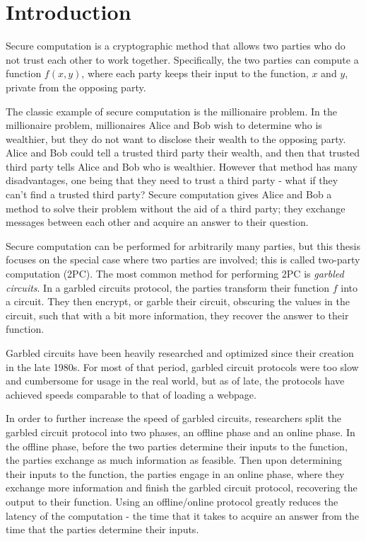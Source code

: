 

\chapter*{Introduction}

Secure computation is a cryptographic method that allows two parties who do not trust each other to work together. 
Specifically, the two parties can compute a function $f(x,y)$, where each party keeps their input to the function, $x$ and $y$, private from the opposing party.

The classic example of secure computation is the millionaire problem.
In the millionaire problem, millionaires Alice and Bob wish to determine who is wealthier, but they do not want to disclose their wealth to the opposing party.
Alice and Bob could tell a trusted third party their wealth, and then that trusted third party tells Alice and Bob who is wealthier.
However that method has many disadvantages, one being that they need to trust a third party - what if they can't find a trusted third party?
Secure computation gives Alice and Bob a method to solve their problem without the aid of a third party; they exchange messages between each other and acquire an answer to their question.

Secure computation can be performed for arbitrarily many parties, but this thesis focuses on the special case where two parties are involved; this is called two-party computation (2PC).
The most common method for performing 2PC is \textit{garbled circuits}.
In a garbled circuits protocol, the parties transform their function $f$ into a circuit. 
They then encrypt, or garble their circuit, obscuring the values in the circuit, such that with a bit more information, they recover the answer to their function.

Garbled circuits have been heavily researched and optimized since their creation in the late 1980s.
For most of that period, garbled circuit protocols were too slow and cumbersome for usage in the real world, but as of late, the protocols have achieved speeds comparable to that of loading a webpage. 

In order to further increase the speed of garbled circuits, researchers split the garbled circuit protocol into two phases, an offline phase and an online phase.
In the offline phase, before the two parties determine their inputs to the function, the parties exchange as much information as feasible. 
Then upon determining their inputs to the function, the parties engage in an online phase, where they exchange more information and finish the garbled circuit protocol, recovering the output to their function.
Using an offline/online protocol greatly reduces the latency of the computation - the time that it takes to acquire an answer from the time that the parties determine their inputs.

